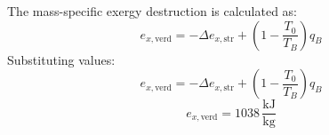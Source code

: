 The mass-specific exergy destruction is calculated as:  
\[
e_{x,\text{verd}} = -\Delta e_{x,\text{str}} + \left(1 - \frac{T_0}{T_B}\right) q_B
\]  
Substituting values:  
\[
e_{x,\text{verd}} = -\Delta e_{x,\text{str}} + \left(1 - \frac{T_0}{T_B}\right) q_B
\]  
\[
e_{x,\text{verd}} = 1038 \, \frac{\text{kJ}}{\text{kg}}
\]